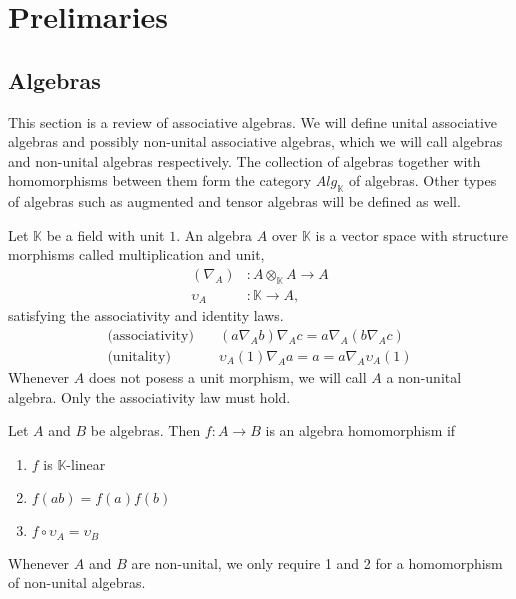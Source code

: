 \documentclass[../thesis.tex]{subfiles}
\begin{document}
    \section{Prelimaries}    
    \subsection{Algebras}

            This section is a review of associative algebras. We will define unital associative algebras and possibly non-unital associative algebras, which we will call algebras and non-unital algebras respectively. The collection of algebras together with homomorphisms between them form the category $Alg_{\mathbb{K}}$ of algebras. Other types of algebras such as augmented and tensor algebras will be defined as well.

            \begin{definition}[Algebra]
                Let $\mathbb{K}$ be a field with unit $1$. An algebra $A$ over $\mathbb{K}$ is a vector space with structure morphisms called multiplication and unit,
                \begin{align*}
                    (\nabla_A) & : A\otimes_{\mathbb{K}}A \rightarrow A \\
                    \upsilon_A & : \mathbb{K} \rightarrow A,
                \end{align*}
                satisfying the associativity and identity laws. 
                \begin{align*}
                    \text{(associativity)}\quad & (a \nabla_A b) \nabla_A c = a \nabla_A (b \nabla_A c) \\
                    \text{(unitality)}\quad & \upsilon_A(1) \nabla_A a = a = a \nabla_A \upsilon_A(1)
                \end{align*}
                Whenever $A$ does not posess a unit morphism, we will call $A$ a non-unital algebra. Only the associativity law must hold.
            \end{definition}

            \begin{definition}
                Let $A$ and $B$ be algebras. Then $f: A\rightarrow B$ is an algebra homomorphism if
                \begin{enumerate}
                    \item $f$ is $\mathbb{K}$-linear
                    \item $f(ab)=f(a)f(b)$
                    \item $f\circ\upsilon_A = \upsilon_B$
                \end{enumerate}
                Whenever $A$ and $B$ are non-unital, we only require 1 and 2 for a homomorphism of non-unital algebras.
            \end{definition}
\end{document}
